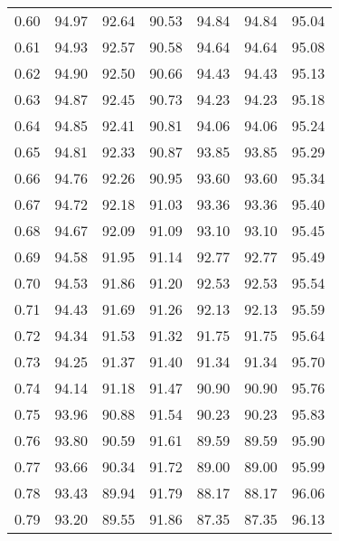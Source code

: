 \begin{tabular}{|c|c|c|c|c|c|c|}
      0.60 &     94.97 &     92.64 &      90.53 &   94.84 &      94.84 &         95.04 \\
      0.61 &     94.93 &     92.57 &      90.58 &   94.64 &      94.64 &         95.08 \\
      0.62 &     94.90 &     92.50 &      90.66 &   94.43 &      94.43 &         95.13 \\
      0.63 &     94.87 &     92.45 &      90.73 &   94.23 &      94.23 &         95.18 \\
      0.64 &     94.85 &     92.41 &      90.81 &   94.06 &      94.06 &         95.24 \\
      0.65 &     94.81 &     92.33 &      90.87 &   93.85 &      93.85 &         95.29 \\
      0.66 &     94.76 &     92.26 &      90.95 &   93.60 &      93.60 &         95.34 \\
      0.67 &     94.72 &     92.18 &      91.03 &   93.36 &      93.36 &         95.40 \\
      0.68 &     94.67 &     92.09 &      91.09 &   93.10 &      93.10 &         95.45 \\
      0.69 &     94.58 &     91.95 &      91.14 &   92.77 &      92.77 &         95.49 \\
      0.70 &     94.53 &     91.86 &      91.20 &   92.53 &      92.53 &         95.54 \\
      0.71 &     94.43 &     91.69 &      91.26 &   92.13 &      92.13 &         95.59 \\
      0.72 &     94.34 &     91.53 &      91.32 &   91.75 &      91.75 &         95.64 \\
      0.73 &     94.25 &     91.37 &      91.40 &   91.34 &      91.34 &         95.70 \\
      0.74 &     94.14 &     91.18 &      91.47 &   90.90 &      90.90 &         95.76 \\
      0.75 &     93.96 &     90.88 &      91.54 &   90.23 &      90.23 &         95.83 \\
      0.76 &     93.80 &     90.59 &      91.61 &   89.59 &      89.59 &         95.90 \\
      0.77 &     93.66 &     90.34 &      91.72 &   89.00 &      89.00 &         95.99 \\
      0.78 &     93.43 &     89.94 &      91.79 &   88.17 &      88.17 &         96.06 \\
      0.79 &     93.20 &     89.55 &      91.86 &   87.35 &      87.35 &         96.13 \\

\end{tabular}
